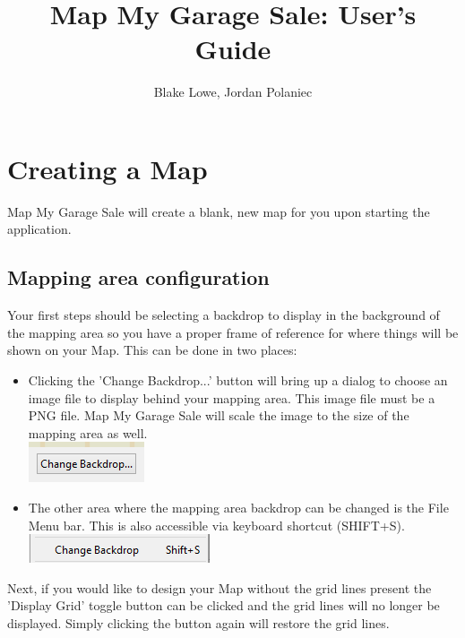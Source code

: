 \documentclass{report}
\title{Map My Garage Sale: User's Guide}
\author{Blake Lowe, Jordan Polaniec}
\begin{document}
\maketitle
\newpage
{}

\tableofcontents
\newpage

\chapter{Creating a Map}

Map My Garage Sale will create a blank, new map for you upon starting the application.  

\section{Mapping area configuration}
Your first steps should be selecting a backdrop to display in the background of the mapping area
so you have a proper frame of reference for where things will be shown on your Map.  
This can be done in two places:

\begin{itemize}
\item 
	Clicking the 'Change Backdrop...' button will bring up a dialog to choose an image file to display
behind your mapping area.  This image file must be a PNG file.  Map My Garage Sale will scale the 
image to the size of the mapping area as well.\\

\includegraphics{changebackdropbutton.png}\\

\item
	The other area where the mapping area backdrop can be changed is the File Menu bar.
This is also accessible via keyboard shortcut (SHIFT+S).\\

\includegraphics{changebackdropmenu.png}\\

\end{itemize}

Next, if you would like to design your Map without the grid lines present the 'Display Grid' toggle
button can be clicked and the grid lines will no longer be displayed.  Simply clicking the button again will restore
the grid lines.\\
\end{document}
